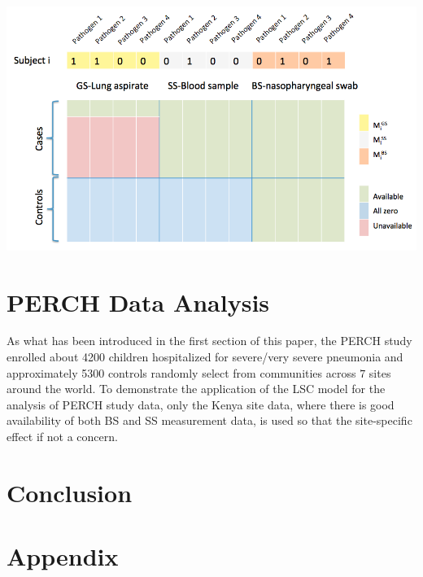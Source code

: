 \documentclass[11 pt, a4paper]{article}  %
\begin{document}
\begin{center}
\includegraphics[scale=0.45]{DataDescription.png}
\label{}
\end{center}


\section{PERCH Data Analysis}
As what has been introduced in the first section of this paper, the PERCH study enrolled about 4200 children hospitalized for severe/very severe pneumonia and approximately 5300 controls randomly select from communities across $7$ sites around the world. To demonstrate the application of the LSC model for the analysis of PERCH study data, only the Kenya site data, where there is good availability of both BS and SS measurement data, is used so that the site-specific effect if not a concern. 


\section{Conclusion}





\section*{Appendix}

\end{document}
